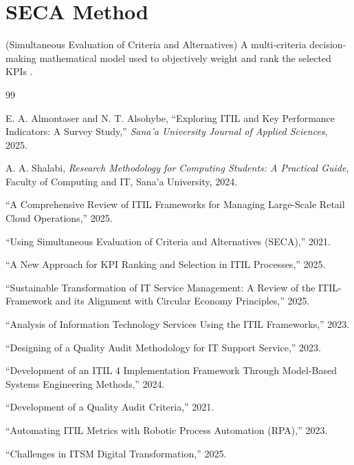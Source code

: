\documentclass[12pt,a4paper,oneside]{report}
\begin{document}
\section{SECA Method}
(Simultaneous Evaluation of Criteria and Alternatives) A multi-criteria decision-making mathematical model used to objectively weight and rank the selected KPIs \cite{almontaser2025}.

\begin{thebibliography}{99}

E. A. Almontaser and N. T. Alsohybe, ``Exploring ITIL and Key Performance Indicators: A Survey Study,'' \emph{Sana'a University Journal of Applied Sciences}, 2025.

A. A. Shalabi, \emph{Research Methodology for Computing Students: A Practical Guide}, Faculty of Computing and IT, Sana'a University, 2024.

``A Comprehensive Review of ITIL Frameworks for Managing Large-Scale Retail Cloud Operations,'' 2025.

``Using Simultaneous Evaluation of Criteria and Alternatives (SECA),'' 2021.

``A New Approach for KPI Ranking and Selection in ITIL Processes,'' 2025.

``Sustainable Transformation of IT Service Management: A Review of the ITIL-Framework and its Alignment with Circular Economy Principles,'' 2025.

``Analysis of Information Technology Services Using the ITIL Frameworks,'' 2023.

``Designing of a Quality Audit Methodology for IT Support Service,'' 2023.

``Development of an ITIL 4 Implementation Framework Through Model-Based Systems Engineering Methods,'' 2024.

``Development of a Quality Audit Criteria,'' 2021.

``Automating ITIL Metrics with Robotic Process Automation (RPA),'' 2023.

``Challenges in ITSM Digital Transformation,'' 2025.


\end{thebibliography}
\end{document}
